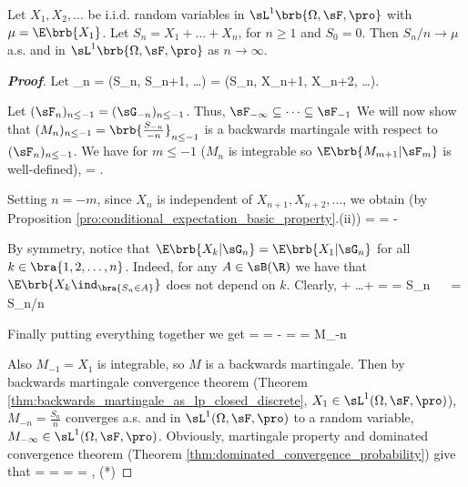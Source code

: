 \begin{theorem}\label{thm:slln_martingale}
Let $X_1, X_2, \dots$ be i.i.d. random variables in $\sL^1\brb{\Omega,\sF,\pro}$ with $\mu = \E\brb{X_1}$. Let $S_n = X_1 + \dots + X_n$, for $n\geq 1$ and $S_0 = 0$. Then $S_n/n \to \mu$ a.s. and in $\sL^1\brb{\Omega,\sF,\pro}$ as $n\to \infty$.
\end{theorem}

\begin{proof}[\bf Proof]%
Let
\be
\sG_n = \sigma(S_n, S_{n+1}, \dots) = \sigma(S_n, X_{n+1}, X_{n+2}, \dots ).
\ee

Let $(\sF_n)_{n\leq -1} = (\sG_{-n})_{n\leq -1}$. Thus, $\sF_{-\infty} \subseteq \dots \subseteq \sF_{-1}$ We will now show that $(M_n)_{n\leq -1} = \brb{\frac{S_{-n}}{-n}}_{n \leq -1}$ is a backwards martingale with respect to $(\sF_n)_{n\leq -1}$. We have for $m \leq -1$ ($M_n$ is integrable so $\E\brb{M_{m+1}|\sF_m}$ is well-defined),
\be
\E{} = \E {}.
\ee

Setting $n=-m$, since $X_n$ is independent of $X_{n+1},X_{n+2},\dots$, we obtain (by Proposition \ref{pro:conditional_expectation_basic_property}.(ii))
\be
\E{} = \E{} =  - \E{} 
\ee

By symmetry, notice that $\E\brb{X_k|\sG_n} = \E\brb{X_1|\sG_n}$ for all $k\in \bra{1,2,\dots,n}$. Indeed, for any $A\in \sB(\R)$ we have that $\E\brb{X_k\ind_{\bra{S_n\in A}}}$ does not depend on $k$. Clearly,
\be
\E{} + \dots + \E{} = \E{} = S_n  \ \ra \ \E{} = S_n/n 
\ee


Finally putting everything together we get
\be
\E{} =  \E{} =  -  =  = M_{-n} 
\ee

Also $M_{-1} = X_1$ is integrable, so $M$ is a backwards martingale. Then by backwards martingale convergence theorem (Theorem \ref{thm:backwards_martingale_as_lp_closed_discrete}, $X_1\in \sL^1(\Omega,\sF,\pro)$), $M_{-n} = \frac{S_n}{n}$ converges a.s. and in $\sL^1(\Omega,\sF,\pro)$ to a random variable, $M_{-\infty}\in \sL^1(\Omega,\sF,\pro)$. Obviously, martingale property and dominated convergence theorem (Theorem \ref{thm:dominated_convergence_probability}) give that %
\be
\mu = \E{} = \E{} = \E{} = \E {} \to \E{}, \quad (*)
\ee





\end{proof}
